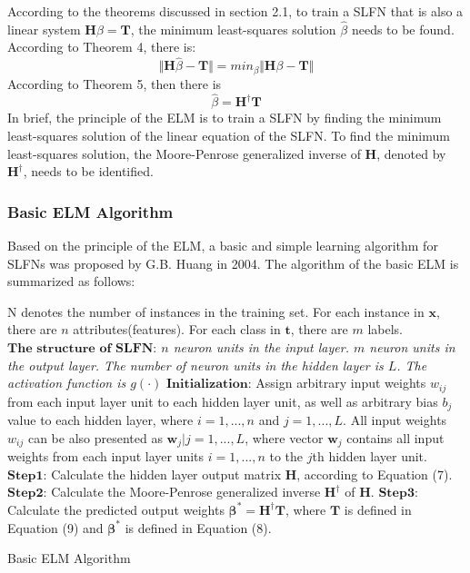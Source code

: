 \documentclass[a4paper, 14pt]{extarticle}
\begin{document}
\par According to the theorems discussed in section 2.1, to train a SLFN that is also a linear system \(\mathbf{H}\beta = \mathbf{T}\), the minimum least-squares solution \(\hat{\beta}\) needs to be found. According to Theorem 4, there is:
\begin{equation}
    \Vert\mathbf{H}\hat{\beta}-\mathbf{T}\Vert = {min}_{\beta}\Vert\mathbf{H}\beta-\mathbf{T}\Vert
\end{equation}
According to Theorem 5, then there is 
\begin{equation}
    \hat{\beta} = \mathbf{H}^\dagger\mathbf{T}
\end{equation}
In brief, the principle of the ELM is to train a SLFN by finding the minimum least-squares solution of the linear equation of the SLFN. To find the minimum least-squares solution, the Moore-Penrose generalized inverse of \(\mathbf{H}\), denoted by \(\mathbf{H}^\dagger\), needs to be identified.  
\subsubsection{Basic ELM Algorithm}
Based on the principle of the ELM, a basic and simple learning algorithm for SLFNs was proposed by G.B. Huang in 2004\cite{G.B.Huang-ICNN}. The algorithm of the basic ELM is summarized as follows:
\newline \par
\begin{algorithm}[H]
\SetAlgoLined
{}
\BlankLine
{}  N denotes the number of instances in the training set. For each instance in \( \mathbf{x}\), there are \(n\) attributes(features). For each class in \( \mathbf{t}\), there are \(m\) labels.
\BlankLine
\emph{$\textbf{The structure of SLFN:}$ \(n\) neuron units in the input layer. \(m\) neuron units in the output layer. The number of neuron units in the hidden layer is \(L\). The activation function is \(g(\cdot)\)}
\BlankLine
$\textbf{Initialization:}$ Assign arbitrary input weights \(w_{ij}\) from each input layer unit to each hidden layer unit, as well as arbitrary bias \(b_j\) value to each hidden layer, where \(i=1,...,n\) and \(j=1,...,L\). All input weights \(w_{ij}\) can be also presented as \(\mathbf{w}_j \vert j=1,...,L\), where vector \(\mathbf{w}_j\) contains all input weights from each input layer units \(i=1,...,n\) to the \(j\)th hidden layer unit. 
\BlankLine
$\textbf{Step1:}$ Calculate the hidden layer output matrix \(\mathbf{H}\), according to Equation (7).
\BlankLine
$\textbf{Step2:}$ Calculate the Moore-Penrose generalized inverse \(\mathbf{H}^\dagger\) of \(\mathbf{H}\).
\BlankLine
$\textbf{Step3:}$ Calculate the predicted output weights \(\mathbf{\beta}^*= \mathbf{H}^\dagger\mathbf{T}\), where \(\mathbf{T}\) is defined in Equation (9) and \(\mathbf{\beta}^* \) is defined in Equation (8). 
\BlankLine
\Output{\(\mathbf{\beta}^*\)}
\BlankLine
 \caption{Basic ELM Algorithm}
\end{algorithm}
\end{document}
